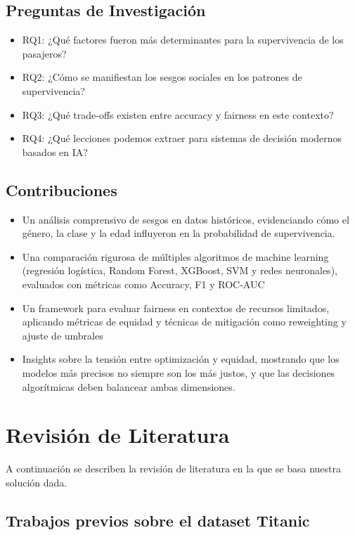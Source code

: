 \documentclass[sjournal]{IEEEtran}
\begin{document}
\subsection{Preguntas de Investigación}
\begin{itemize}
    \item RQ1: ¿Qué factores fueron más determinantes para la supervivencia de los pasajeros?
    \item RQ2: ¿Cómo se manifiestan los sesgos sociales en los patrones de supervivencia?
    \item RQ3: ¿Qué trade-offs existen entre accuracy y fairness en este contexto?
    \item RQ4: ¿Qué lecciones podemos extraer para sistemas de decisión modernos basados en IA?
\end{itemize}
\subsection{Contribuciones}
\begin{itemize}
Las contribuciones principales de este trabajo son:
\item Un análisis comprensivo de sesgos en datos históricos, evidenciando cómo el género, la clase y la edad influyeron en la probabilidad de supervivencia.
\item Una comparación rigurosa de múltiples algoritmos de machine learning (regresión logística, Random Forest, XGBoost, SVM y redes neuronales), evaluados con métricas como Accuracy, F1 y ROC-AUC
\item Un framework para evaluar fairness en contextos de recursos limitados, aplicando métricas de equidad y técnicas de mitigación como reweighting y ajuste de umbrales
\item Insights sobre la tensión entre optimización y equidad, mostrando que los modelos más precisos no siempre son los más justos, y que las decisiones algorítmicas deben balancear ambas dimensiones.
\end{itemize}
\section{Revisión de Literatura}

\noindent
A continuación se describen la revisión de literatura en la que se basa nuestra solución dada.

\subsection{Trabajos previos sobre el dataset Titanic
}
\end{document}
